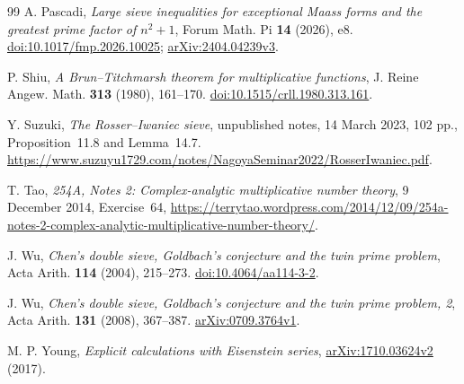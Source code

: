 \begin{thebibliography}{99}
A. Pascadi,
\emph{Large sieve inequalities for exceptional Maass forms and the
greatest prime factor of $n^2+1$}, Forum Math. Pi \textbf{14} (2026), e8.
\href{https://doi.org/10.1017/fmp.2026.10025}{doi:10.1017/fmp.2026.10025};
\href{https://arxiv.org/abs/2404.04239v3}{arXiv:2404.04239v3}.

P. Shiu,
\emph{A Brun--Titchmarsh theorem for multiplicative functions},
J. Reine Angew. Math. \textbf{313} (1980), 161--170.
\href{https://doi.org/10.1515/crll.1980.313.161}{doi:10.1515/crll.1980.313.161}.

Y. Suzuki,
\emph{The Rosser--Iwaniec sieve}, unpublished notes, 14 March 2023,
102 pp., Proposition~11.8 and Lemma~14.7.
\url{https://www.suzuyu1729.com/notes/NagoyaSeminar2022/RosserIwaniec.pdf}.

T. Tao,
\emph{254A, Notes 2: Complex-analytic multiplicative number theory},
9 December 2014, Exercise~64,
\url{https://terrytao.wordpress.com/2014/12/09/254a-notes-2-complex-analytic-multiplicative-number-theory/}.

J. Wu,
\emph{Chen's double sieve, Goldbach's conjecture and the twin prime
problem}, Acta Arith. \textbf{114} (2004), 215--273.
\href{https://doi.org/10.4064/aa114-3-2}{doi:10.4064/aa114-3-2}.

J. Wu,
\emph{Chen's double sieve, Goldbach's conjecture and the twin prime
problem, 2}, Acta Arith. \textbf{131} (2008), 367--387.
\href{https://arxiv.org/abs/0709.3764v1}{arXiv:0709.3764v1}.

M. P. Young,
\emph{Explicit calculations with Eisenstein series},
\href{https://arxiv.org/abs/1710.03624v2}{arXiv:1710.03624v2} (2017).
\end{thebibliography}

